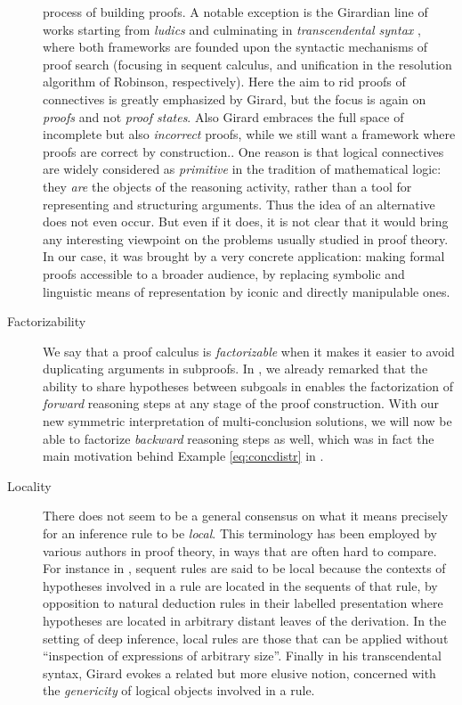 \begin{description}
{    process of building proofs. A notable exception is the Girardian line of
    works starting from \emph{ludics} \cite{girard_locus_2001} and culminating
    in \emph{transcendental syntax} \cite{eng_exegesis_2023}, where both
    frameworks are founded upon the syntactic mechanisms of proof search
    (focusing in sequent calculus, and unification in the resolution algorithm
    of Robinson, respectively). Here the aim to rid proofs of connectives is
    greatly emphasized by Girard, but the focus is again on \emph{proofs} and
    not \emph{proof states}. Also Girard embraces the full space of incomplete
    but also \emph{incorrect} proofs, while we still want a framework where
    proofs are correct by construction.}. One reason is that logical connectives
    are widely considered as \emph{primitive} in the tradition of mathematical
    logic: they \emph{are} the objects of the reasoning activity, rather than a
    tool for representing and structuring arguments. Thus the idea of an
    alternative does not even occur. But even if it does, it is not clear that
    it would bring any interesting viewpoint on the problems usually studied in
    proof theory. In our case, it was brought by a very concrete application:
    making formal proofs accessible to a broader audience, by replacing symbolic
    and linguistic means of representation by iconic and directly manipulable
    ones.
  \item[Factorizability]
    We say that a proof calculus is \emph{factorizable} when it makes it easier
    to avoid duplicating arguments in subproofs. In , we
    already remarked that the ability to share hypotheses between subgoals in
     enables the factorization of \emph{forward} reasoning steps at any
    stage of the proof construction. With our new symmetric interpretation of
    multi-conclusion solutions, we will now be able to factorize \emph{backward}
    reasoning steps as well, which was in fact the main motivation behind
    Example \ref{eq:concdistr} in .
  \item[Locality]
    There does not seem to be a general consensus on what it means precisely for
    an inference rule to be \emph{local}. This terminology has been employed by
    various authors in proof theory, in ways that are often hard to compare. For
    instance in , sequent rules are said to be
    local because the contexts of hypotheses involved in a rule are located in
    the sequents of that rule, by opposition to natural deduction rules in their
    labelled presentation where hypotheses are located in arbitrary distant
    leaves of the derivation. In the setting of deep inference, local rules are
    those that can be applied without ``inspection of expressions of arbitrary
    size''. Finally in his transcendental
    syntax, Girard evokes a related but more elusive notion, concerned with the
    \emph{genericity} of logical objects involved in a rule.
    

\end{description}
